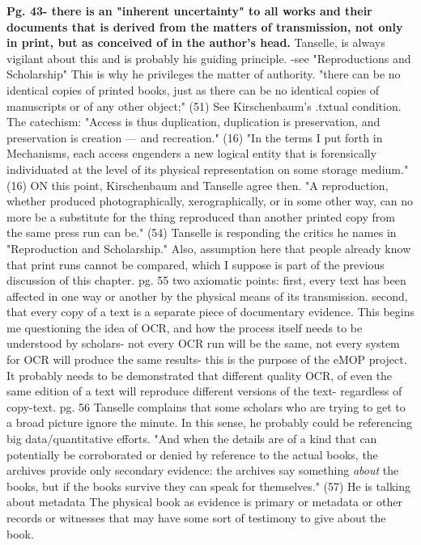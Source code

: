 \documentclass[course, english]{Notes}
\newcommand{\n}{\scalebox{2}{\textbf{\framebox{$\aleph$} } } }
\begin{document}
\begin{outline}
\1 \textbf{Pg. 43- there is an "inherent uncertainty" to all works and their documents that is derived from the matters of transmission, not only in print, but as conceived of in the author's head.}
	\2 Tanselle, is always vigilant about this and is probably his guiding principle. -see "Reproductions and Scholarship"
	\2 This is why he privileges the matter of authority.
\1 "there can be no identical copies of printed books, just as there can be no identical copies of manuscripts or of any other object;" (51)
	\2 See Kirschenbaum's .txtual condition. The catechism: "Access is thus duplication, duplication is preservation, and preservation is creation — and recreation." (16)
		\3 "In the terms I put forth in Mechanisms, each access engenders a new logical entity that is forensically individuated at the level of its physical representation on some storage medium." (16)
		\3 ON this point, Kirschenbaum and Tanselle agree then.  
\1 "A reproduction, whether produced photographically, xerographically, or in some other way, can no more be a substitute for the thing reproduced than another printed copy from the same press run can be." (54)
	\2 Tanselle is responding the critics he names in "Reproduction and Scholarship."
	\2 Also, assumption here that people already know that print runs cannot be compared, which I suppose is part of the previous discussion of this chapter.
\1 pg. 55 two axiomatic points: 
	\2 first, every text has been affected in one way or another by the physical means of its transmission.
	\2 second, that every copy of a text is a separate piece of documentary evidence.
		\2 \n This begins me questioning the idea of OCR, and how the process itself needs to be understood by scholars- not every OCR run will be the same, not every system for OCR will produce the same results- this is the purpose of the eMOP project.
			\3 It probably needs to be demonstrated that different quality OCR, of even the same edition of a text will reproduce different versions of the text- regardless of copy-text.
\1 pg. 56 Tanselle complains that some scholars who are trying to get to a broad picture ignore the minute. In this sense, he probably could be referencing big data/quantitative efforts.
\1 "And when the details are of a kind that can potentially be corroborated or denied by reference to the actual books, the archives provide only secondary evidence: the archives say something \textit{about} the books, but if the books survive they can speak for themselves." (57)
	\2 He is talking about metadata
	\2 The physical book as evidence is primary or metadata or other records or witnesses that may have some sort of testimony to give about the book. 

\end{outline}
\end{document}
